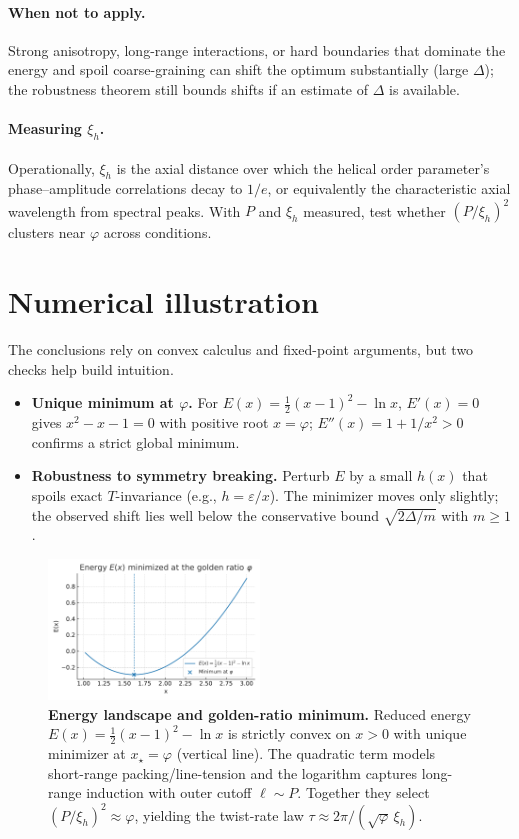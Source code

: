 \documentclass[11pt]{article}
\theoremstyle{remark}
\theoremstyle{definition}
\newcommand{\ph}{\varphi}
\newcommand{\eps}{\varepsilon}
\begin{document}
\paragraph{When not to apply.} Strong anisotropy, long-range interactions, or hard boundaries that dominate the energy and spoil coarse-graining can shift the optimum substantially (large $\Delta$); the robustness theorem still bounds shifts if an estimate of $\Delta$ is available.
\paragraph{Measuring $\xi_h$.} Operationally, $\xi_h$ is the axial distance over which the helical order parameter's phase--amplitude correlations decay to $1/e$, or equivalently the characteristic axial wavelength from spectral peaks. With $P$ and $\xi_h$ measured, test whether $(P/\xi_h)^2$ clusters near $\ph$ across conditions.

\section{Numerical illustration}
The conclusions rely on convex calculus and fixed-point arguments, but two checks help build intuition.
\begin{itemize}[leftmargin=1.15em]
  \item \textbf{Unique minimum at $\ph$.} For $E(x)=\tfrac12(x-1)^2-\ln x$, $E'(x)=0$ gives $x^2-x-1=0$ with positive root $x=\ph$; $E''(x)=1+1/x^2>0$ confirms a strict global minimum.
  \item \textbf{Robustness to symmetry breaking.} Perturb $E$ by a small $h(x)$ that spoils exact $T$-invariance (e.g., $h=\eps/x$). The minimizer moves only slightly; the observed shift lies well below the conservative bound $\sqrt{2\Delta/m}$ with $m\ge1$.
\end{itemize}

\begin{figure}[t]
  \centering
  \includegraphics[width=0.5\textwidth]{E_of_x_min_at_phi.pdf}
  \caption{\textbf{Energy landscape and golden-ratio minimum.}
    Reduced energy $E(x)=\tfrac12(x-1)^2-\ln x$ is strictly convex on $x>0$ with unique minimizer at $x_\star=\varphi$ (vertical line). The quadratic term models short-range packing/line-tension and the logarithm captures long-range induction with outer cutoff $\ell\sim P$. Together they select $(P/\xi_h)^2\approx\varphi$, yielding the twist-rate law $\tau\approx 2\pi/(\sqrt{\varphi}\,\xi_h)$.}
  \label{fig:energy-min}
\end{figure}
\end{document}
